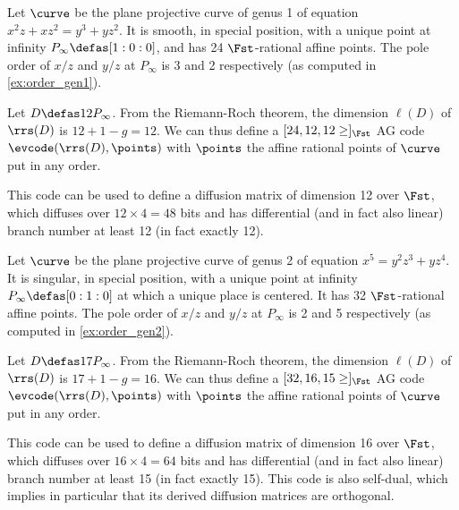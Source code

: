 \begin{example}
Let $\curve$ be the plane projective curve of genus 1 of equation $x^2z + xz^2 = y^3 + yz^2$. It is smooth, in special position,
with a unique point at infinity $P_\infty \defas [1:0:0]$, and has 24 $\Fst$-rational affine points. The pole order
of $x/z$ and $y/z$ at $P_\infty$ is 3 and 2 respectively (as computed in \autoref{ex:order_gen1}).

Let $D \defas 12P_\infty$. From the Riemann-Roch theorem, the dimension $\ell(D)$ of $\rrs(D)$ is $12 + 1 - g = 12$. We can thus
define a $[24, 12, 12 \geq]_{\Fst}$ AG code $\evcode(\rrs(D), \points)$ with $\points$ the affine rational points of $\curve$
put in any order.

This code can be used to define a diffusion matrix of dimension 12 over $\Fst$, which diffuses over $12\times 4 = 48$ bits and
has differential (and in fact also linear) branch number at least 12 (in fact exactly 12). 
\end{example}

\begin{example}
\label{ex:genus2}
Let $\curve$ be the plane projective curve of genus 2 of equation $x^5 = y^2z^3 + yz^4$. It is singular, in special position,
with a unique point at infinity $P_\infty \defas [0:1:0]$ at which a unique place is centered. It has 32 $\Fst$-rational affine points. The pole order
of $x/z$ and $y/z$ at $P_\infty$ is 2 and 5 respectively (as computed in \autoref{ex:order_gen2}).

Let $D \defas 17P_\infty$. From the Riemann-Roch theorem, the dimension $\ell(D)$ of $\rrs(D)$ is $17 + 1 - g = 16$. We can thus
define a $[32, 16, 15 \geq]_{\Fst}$ AG code $\evcode(\rrs(D), \points)$ with $\points$ the affine rational points of $\curve$
put in any order.

This code can be used to define a diffusion matrix of dimension 16 over $\Fst$, which diffuses over $16\times 4 = 64$ bits and
has differential (and in fact also linear) branch number at least 15 (in fact exactly 15). This code is also self-dual,
which implies in particular that its derived diffusion matrices are orthogonal.
\end{example}
